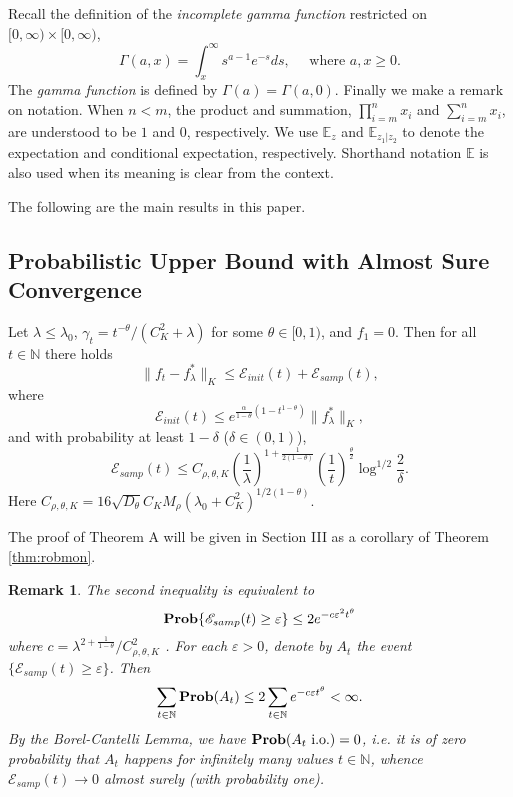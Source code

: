 \documentclass[twoside,twocolumn,journal]{IEEEtran}
\newtheorem{rem}[thm]{Remark}
\newenvironment{mainthm}[1][Main Theorem]{\medskip \noindent {\bf #1.}\begin{em}}{\end{em}\medskip}
\def\N{{\mathbb N}}
\def\E{{\mathbb E}}        %
\def\Err{{\mathscr E}}
\def\Prob{{\bf Prob}}
\begin{document}
Recall the definition of the \emph{incomplete gamma function} restricted on $[0,\infty)\times [0,\infty)$,
\[ \Gamma(a,x)=\int_x^\infty s^{a-1} e^{-s} d s, \ \ \ \ \ \ \mbox{where $a,x\geq 0$}. \]
The \emph{gamma function} is defined by $\Gamma(a) = \Gamma(a,0)$. Finally we make a remark on notation. When $n<m$, the product and summation,
$\prod_{i=m}^n x_i$ and $\sum_{i=m}^n x_i$, are understood to be $1$ and $0$, respectively. We use $\E_z$ and $\E_{z_1|z_2}$ to denote the
expectation and conditional expectation, respectively. Shorthand notation $\E$ is also used when its meaning is clear from the context.


The following are the main results in this paper.

%
%

\subsection{Probabilistic Upper Bound with Almost Sure Convergence}

\begin{mainthm}[Theorem A]
Let $\lambda\leq \lambda_0$, $\gamma_t = t^{-\theta}/(C^2_K + \lambda)$ for some $\theta\in [0,1)$, and $f_1=0$.
Then for all $t\in \N$ there holds
\[ \| f_t - f^\ast_\lambda \|_K \leq \Err_{init}(t) + \Err_{samp}(t), \]
where
\[ \Err_{init}(t)\leq e^{\frac{\alpha}{1-\theta}(1-t^{1-\theta})} \|f^\ast_\lambda\|_K, \]
and with probability at least $1-\delta$ ($\delta\in (0,1)$),
\[ \Err_{samp}(t) \leq C_{\rho,\theta,K}  \left(\frac{1}{\lambda} \right)^{1+\frac{1}{2(1-\theta)}}
\left(\frac{1}{t}\right)^{\frac{\theta}{2}} \log^{1/2}\frac{2}{\delta}. \]
Here $C_{\rho,\theta,K} = 16\sqrt{D_\theta}C_K M_{\rho}(\lambda_0+C^2_K)^{1/2(1-\theta)}$.
\end{mainthm}

The proof of Theorem A will be given in Section III as a corollary of Theorem \ref{thm:robmon}.

\medskip

\begin{rem} The second inequality is equivalent to
\[ \Prob \{ \Err_{samp}(t) \geq \varepsilon  \} \leq 2e^{- c \varepsilon^2 t^{\theta} } \]
where $c= \lambda^{2+\frac{1}{1-\theta}}/C^{2}_{\rho,\theta,K}$ .
For each $\varepsilon>0$, denote by $A_t$ the event $\{\Err_{samp}(t)\geq \varepsilon\}$. Then
\[ \sum_{t\in \N} \Prob (A_t) \leq 2 \sum_{t\in \N} e^{- c\varepsilon t^\theta} < \infty. \]
By the Borel-Cantelli Lemma, we have $\Prob(A_t\mbox{ i.o.})=0$, i.e. it is of zero probability that $A_t$ happens for infinitely many values $t\in \N$,
whence $\Err_{samp}(t)\to 0$ almost surely (with probability one).
\end{rem}
\end{document}
